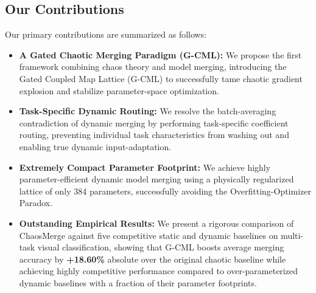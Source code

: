 \subsection{Our Contributions}
Our primary contributions are summarized as follows:
\begin{itemize}
    \item \textbf{A Gated Chaotic Merging Paradigm (G-CML):} We propose the first framework combining chaos theory and model merging, introducing the Gated Coupled Map Lattice (G-CML) to successfully tame chaotic gradient explosion and stabilize parameter-space optimization.
    \item \textbf{Task-Specific Dynamic Routing:} We resolve the batch-averaging contradiction of dynamic merging by performing task-specific coefficient routing, preventing individual task characteristics from washing out and enabling true dynamic input-adaptation.
    \item \textbf{Extremely Compact Parameter Footprint:} We achieve highly parameter-efficient dynamic model merging using a physically regularized lattice of only 384 parameters, successfully avoiding the Overfitting-Optimizer Paradox.
    \item \textbf{Outstanding Empirical Results:} We present a rigorous comparison of ChaosMerge against five competitive static and dynamic baselines on multi-task visual classification, showing that G-CML boosts average merging accuracy by \textbf{+18.60\%} absolute over the original chaotic baseline while achieving highly competitive performance compared to over-parameterized dynamic baselines with a fraction of their parameter footprints.
\end{itemize}
